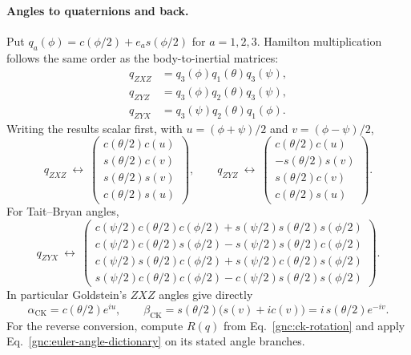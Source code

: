 \paragraph{Angles to quaternions and back.}
Put $q_a(\phi)=c(\phi/2)+e_a s(\phi/2)$ for $a=1,2,3$. Hamilton multiplication
follows the same order as the body-to-inertial matrices:
\begin{equation}\label{gnc:angle-quaternion-products}
 \begin{aligned}
 q_{ZXZ}&=q_3(\phi)q_1(\theta)q_3(\psi),\\
 q_{ZYZ}&=q_3(\phi)q_2(\theta)q_3(\psi),\\
 q_{ZYX}&=q_3(\psi)q_2(\theta)q_1(\phi).
 \end{aligned}
\end{equation}
Writing the results scalar first, with $u=(\phi+\psi)/2$ and
$v=(\phi-\psi)/2$,
\begin{equation}\label{gnc:proper-euler-quaternions}
 q_{ZXZ}\ \longleftrightarrow\
 \begin{pmatrix}c(\theta/2)c(u)\\s(\theta/2)c(v)\\
 s(\theta/2)s(v)\\c(\theta/2)s(u)\end{pmatrix},\qquad
 q_{ZYZ}\ \longleftrightarrow\
 \begin{pmatrix}c(\theta/2)c(u)\\-s(\theta/2)s(v)\\
 s(\theta/2)c(v)\\c(\theta/2)s(u)\end{pmatrix}.
\end{equation}
For Tait--Bryan angles,
\begin{equation}\label{gnc:tait-bryan-quaternion}
 q_{ZYX}\ \longleftrightarrow\
 \begin{pmatrix}
 c(\psi/2)c(\theta/2)c(\phi/2)+s(\psi/2)s(\theta/2)s(\phi/2)\\
 c(\psi/2)c(\theta/2)s(\phi/2)-s(\psi/2)s(\theta/2)c(\phi/2)\\
 c(\psi/2)s(\theta/2)c(\phi/2)+s(\psi/2)c(\theta/2)s(\phi/2)\\
 s(\psi/2)c(\theta/2)c(\phi/2)-c(\psi/2)s(\theta/2)s(\phi/2)
 \end{pmatrix}.
\end{equation}
In particular Goldstein's $ZXZ$ angles give directly
\[
 \alpha_{\mathrm{CK}}=c(\theta/2)e^{iu},\qquad
 \beta_{\mathrm{CK}}=s(\theta/2)\bigl(s(v)+ic(v)\bigr)
                   =i\,s(\theta/2)e^{-iv}.
\]
For the reverse conversion, compute $R(q)$ from
Eq.~\eqref{gnc:ck-rotation} and apply
Eq.~\eqref{gnc:euler-angle-dictionary} on its stated angle branches.

